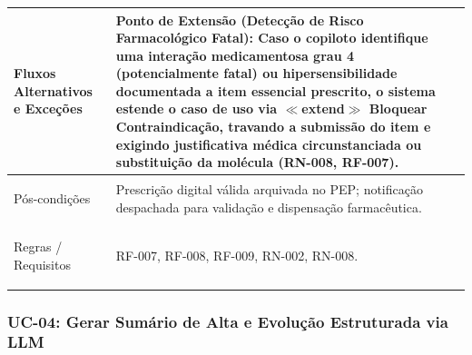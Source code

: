 \begin{tabularx}{\textwidth}{>{\bfseries\raggedright\arraybackslash}p{3.4cm} X}
\midrule
Fluxos Alternativos e Exceções & 
\textbf{Ponto de Extensão (Detecção de Risco Farmacológico Fatal):} Caso o copiloto identifique uma interação medicamentosa grau 4 (potencialmente fatal) ou hipersensibilidade documentada a item essencial prescrito, o sistema estende o caso de uso via $\ll$extend$\gg$ \textbf{Bloquear Contraindicação}, travando a submissão do item e exigindo justificativa médica circunstanciada ou substituição da molécula (RN-008, RF-007). \\
\midrule
Pós-condições & Prescrição digital válida arquivada no PEP; notificação despachada para validação e dispensação farmacêutica. \\
Regras / Requisitos & RF-007, RF-008, RF-009, RN-002, RN-008. \\
\bottomrule
\end{tabularx}
\endgroup

\subsubsection{UC-04: Gerar Sumário de Alta e Evolução Estruturada via LLM}
\label{sec:uc04}


